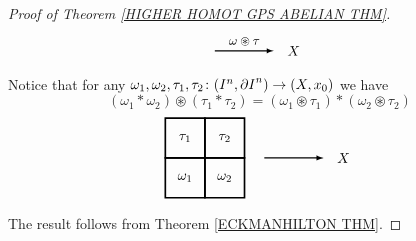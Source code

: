 \begin{proof}[Proof of Theorem \ref{HIGHER HOMOT GPS ABELIAN THM}]
\begin{equation*}
\begin{tikzpicture}
\draw[thick, ->, >=latex] (2.5, 1) -- node[anchor=south] {\small $\omega\circledast\tau$} (4.0,1);
\node at (4.5, 1) {$X$};
\end{tikzpicture}
\end{equation*}
Notice that for any 
$\omega_{1}, \omega_{2}, \tau_{1}, \tau_{2}\colon (I^{n}, {\partial I}^{n})\to (X, x_{0})$
we have 
\[(\omega_{1}\ast \omega_{2}) \circledast (\tau_{1}\ast \tau_{2})
= (\omega_{1}\circledast \tau_{1}) \ast (\omega_{2}\circledast \tau_{2})
\]
\begin{equation*}
\begin{tikzpicture}
\draw[very thick] (0,0) rectangle  node[anchor=center] {$\omega_{1}$} (1,1);
\draw[very thick] (1,0) rectangle node[anchor=center] {$\omega_{2}$}(2,1);
\draw[very thick] (0,1) rectangle node[anchor=center] {$\tau_{1}$}(1,2);
\draw[very thick] (1,1) rectangle node[anchor=center] {$\tau_{2}$}(2,2);
\draw[thick, ->, >=latex] (2.5, 1) -- (4.0,1);
\node at (4.5, 1) {$X$};
\end{tikzpicture}
\end{equation*}
The result follows from Theorem \ref{ECKMANHILTON THM}.
\end{proof}


